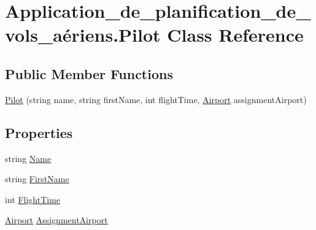 \hypertarget{class_application__de__planification__de__vols__a_xC3_xA9riens_1_1_pilot}{}\section{Application\+\_\+de\+\_\+planification\+\_\+de\+\_\+vols\+\_\+aériens.\+Pilot Class Reference}
\label{class_application__de__planification__de__vols__a_xC3_xA9riens_1_1_pilot}
\subsection*{Public Member Functions}
\begin{DoxyCompactItemize}
\item 
\hyperlink{class_application__de__planification__de__vols__a_xC3_xA9riens_1_1_pilot_a7275b993fad3162863a8f8418c9e721b}{Pilot} (string name, string first\+Name, int flight\+Time, \hyperlink{class_application__de__planification__de__vols__a_xC3_xA9riens_1_1_airport}{Airport} assignment\+Airport)
\end{DoxyCompactItemize}
\subsection*{Properties}
\begin{DoxyCompactItemize}
\item 
string \hyperlink{class_application__de__planification__de__vols__a_xC3_xA9riens_1_1_pilot_a397bc161362554d9b1d76cf134255b14}{Name}
\item 
string \hyperlink{class_application__de__planification__de__vols__a_xC3_xA9riens_1_1_pilot_ab3e8006344beff2d6f8c0c83e20aeaa1}{First\+Name}
\item 
int \hyperlink{class_application__de__planification__de__vols__a_xC3_xA9riens_1_1_pilot_a04a6b4cd1e16d07382bef7536c5cf31e}{Flight\+Time}
\item 
\hyperlink{class_application__de__planification__de__vols__a_xC3_xA9riens_1_1_airport}{Airport} \hyperlink{class_application__de__planification__de__vols__a_xC3_xA9riens_1_1_pilot_a451a7371cde9b8ddbae1a2119b0a4061}{Assignment\+Airport}
\end{DoxyCompactItemize}



